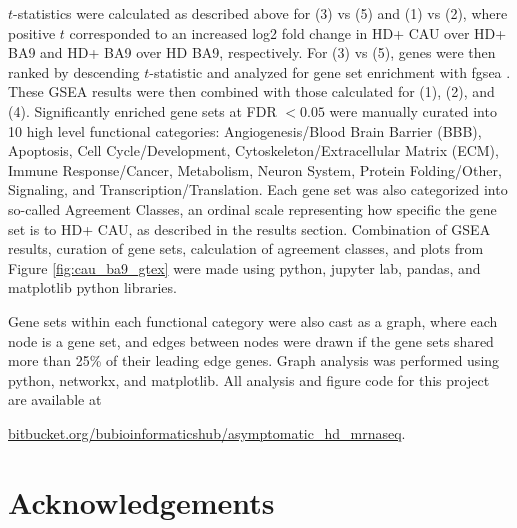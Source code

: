 \documentclass[fleqn,10pt,table]{wlscirep}
\begin{document}
$t$-statistics were calculated as described above for (3) vs (5) and (1) vs (2), where positive $t$ corresponded to an increased log2 fold change in HD+ CAU over HD+ BA9 and HD+ BA9 over HD BA9, respectively.
For (3) vs (5), genes were then ranked by descending $t$-statistic and analyzed for gene set enrichment with fgsea \cite{Sergushichev2016-hz}.
These GSEA results were then combined with those calculated for (1), (2), and (4).
Significantly enriched gene sets at FDR $<0.05$ were manually curated into 10 high level functional categories: Angiogenesis/Blood Brain Barrier (BBB), Apoptosis, Cell Cycle/Development, Cytoskeleton/Extracellular Matrix (ECM), Immune Response/Cancer, Metabolism, Neuron System, Protein Folding/Other, Signaling, and Transcription/Translation.
Each gene set was also categorized into so-called Agreement Classes, an ordinal scale representing how specific the gene set is to HD+ CAU, as described in the results section.
Combination of GSEA results, curation of gene sets, calculation of agreement classes, and plots from Figure \ref{fig:cau_ba9_gtex} were made using python, jupyter lab, pandas, and matplotlib python libraries.

Gene sets within each functional category were also cast as a graph, where each node is a gene set, and edges between nodes were drawn if the gene sets shared more than 25\% of their leading edge genes.
Graph analysis was performed using python, networkx, and matplotlib.
All analysis and figure code for this project are available at

\href{https://bitbucket.org/bubioinformaticshub/asymptomatic_hd_mrnaseq}{bitbucket.org/bubioinformaticshub/asymptomatic\_hd\_mrnaseq}.



\section{Acknowledgements}



\end{document}
